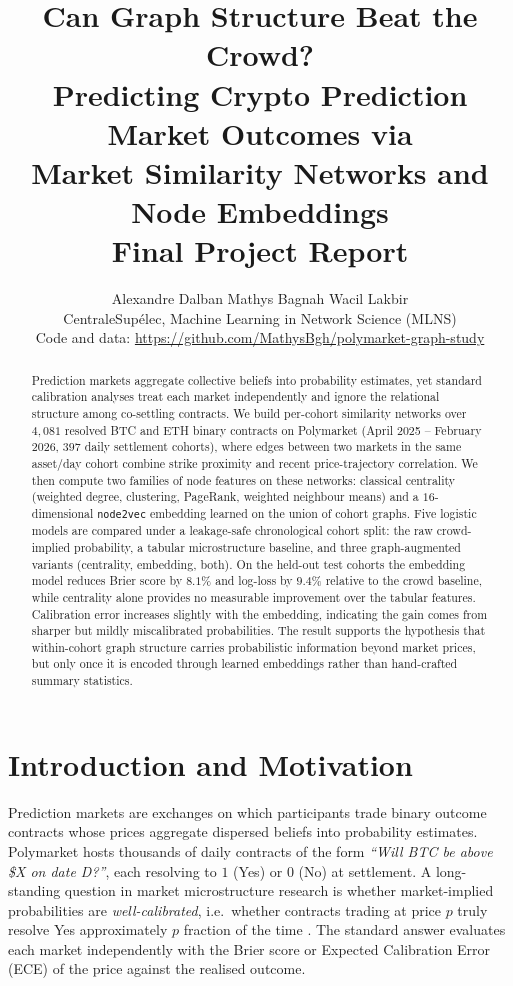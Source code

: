 \documentclass{article} %
\title{Can Graph Structure Beat the Crowd? \\ Predicting Crypto Prediction Market Outcomes via \\ Market Similarity Networks and Node Embeddings \\ \large Final Project Report}
\author{
  Alexandre Dalban \quad Mathys Bagnah \quad Wacil Lakbir \\
  CentraleSup\'{e}lec, Machine Learning in Network Science (MLNS) \\
  Code and data: \url{https://github.com/MathysBgh/polymarket-graph-study}
}
\begin{document}
\maketitle
\fancyhead{}

\begin{abstract}
Prediction markets aggregate collective beliefs into probability estimates, yet standard calibration analyses treat each market independently and ignore the relational structure among co-settling contracts. We build per-cohort similarity networks over $4{,}081$ resolved BTC and ETH binary contracts on Polymarket (April 2025 -- February 2026, $397$ daily settlement cohorts), where edges between two markets in the same asset/day cohort combine strike proximity and recent price-trajectory correlation. We then compute two families of node features on these networks: classical centrality (weighted degree, clustering, PageRank, weighted neighbour means) and a $16$-dimensional \texttt{node2vec} embedding learned on the union of cohort graphs. Five logistic models are compared under a leakage-safe chronological cohort split: the raw crowd-implied probability, a tabular microstructure baseline, and three graph-augmented variants (centrality, embedding, both). On the held-out test cohorts the embedding model reduces Brier score by $8.1\%$ and log-loss by $9.4\%$ relative to the crowd baseline, while centrality alone provides no measurable improvement over the tabular features. Calibration error increases slightly with the embedding, indicating the gain comes from sharper but mildly miscalibrated probabilities. The result supports the hypothesis that within-cohort graph structure carries probabilistic information beyond market prices, but only once it is encoded through learned embeddings rather than hand-crafted summary statistics.
\end{abstract}

\section{Introduction and Motivation}

Prediction markets are exchanges on which participants trade binary outcome contracts whose prices aggregate dispersed beliefs into probability estimates. Polymarket hosts thousands of daily contracts of the form \emph{``Will BTC be above \$X on date D?''}, each resolving to $1$ (Yes) or $0$ (No) at settlement. A long-standing question in market microstructure research is whether market-implied probabilities are \emph{well-calibrated}, i.e.\ whether contracts trading at price $p$ truly resolve Yes approximately $p$ fraction of the time \citep{wolfers2004}. The standard answer evaluates each market independently with the Brier score or Expected Calibration Error (ECE) of the price against the realised outcome.
\end{document}

